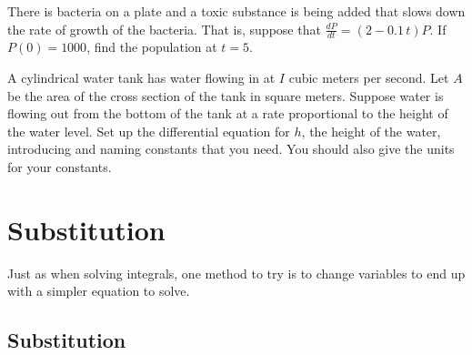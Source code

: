 \begin{exercise}
There is bacteria on a plate and a toxic substance is being added that slows
down the rate of growth of the bacteria.
That is,
suppose that $\frac{dP}{dt} = (2-0.1\,t)P$.  If $P(0) = 1000$, find
the population at $t=5$.
\end{exercise}

\begin{exercise}
A cylindrical water tank has water flowing in at $I$ cubic meters
per second.
Let $A$ be the area of the cross section of the tank in square meters.
Suppose water is
flowing out from the bottom of the tank at a rate proportional to the height of
the water level.  Set up the differential equation for $h$, the height of the
water, introducing and naming
constants that you need.  You should also give the units for your constants.
\end{exercise}


\sectionnewpage
\section{Substitution}
\label{substitution:section}



Just as when solving integrals, one method to try is to change variables to
end up with a simpler equation to solve.

\subsection{Substitution}

